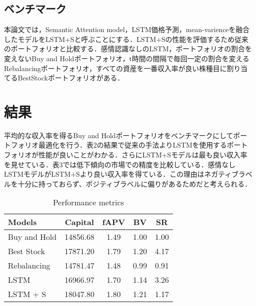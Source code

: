 \documentclass[submit,techrep,noauthor]{ipsj}
\begin{document}
\subsection{ベンチマーク}
本論文では，Semantic Attention model，LSTM価格予測，mean-varienceを融合したモデルをLSTM+Sと呼ぶことにする．LSTM+Sの性能を評価するため従来のポートフォリオと比較する．感情認識なしのLSTM，ポートフォリオの割合を変えないBuy and Holdポートフォリオ，t時間の間隔で毎回一定の割合を変えるRebalancingポートフォリオ，すべての資産を一番収入率が良い株種目に割り当てるBestStockポートフォリオがある．


\section{結果}
平均的な収入率を得るBuy and Holdポートフォリオをベンチマークにしてポートフォリオ最適化を行う．表2の結果で従来の手法よりLSTMを使用するポートフォリオが性能が良いことがわかる．さらにLSTM+Sモデルは最も良い収入率を見せている．表3では低下傾向の市場での精度を比較している．感情なしLSTMモデルがLSTM+Sより良い収入率を得ている．この理由はネガティブラベルを十分に持っておらず、ポジティブラベルに偏りがあるためだと考えられる．



\begin{table}[htb] %
\caption{Performance metrics} %
\label{release} %
\begin{center}
\begin{tabular}{| l | c | c  | c | c |} \hline %
Models & Capital & fAPV &BV & SR  \\ \hline %
Buy and Hold & 14856.68 & 1.49 & 1.00 &  1.00 \\ 
Best Stock &17871.20 &1.79& 1.20 &  4.17 \\
Rebalancing  &14781.47 &  1.48 & 0.99 &  0.91\\
LSTM  & 16966.97 &1.70 & 1.14 &  3.26\\
LSTM + S  &18047.80 &1.80 & 1.21 &  1.17\\ \hline
\end{tabular}
\end{center}
\end{table}
\end{document}
